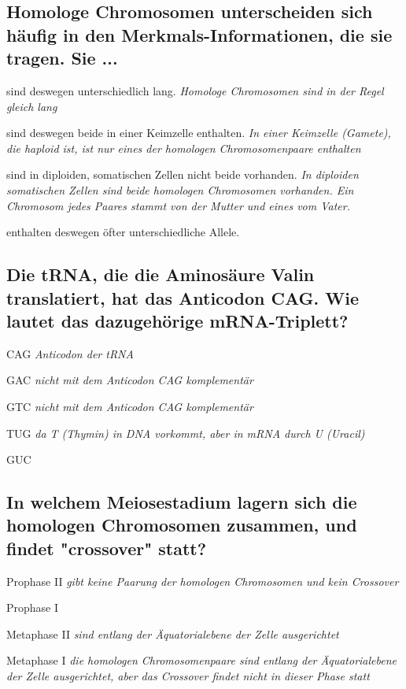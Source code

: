 \documentclass{article}
\newcommand{\cmark}{\ding{51}}%
\newcommand{\done}{\rlap{$\square$}{\raisebox{2pt}{\large\hspace{1pt}\cmark}}%
\hspace{-2.5pt}}
\begin{document}
\subsection*{Homologe Chromosomen unterscheiden sich häufig in den Merkmals-Informationen, die sie tragen. Sie ...}
\begin{todolist} %
\item sind deswegen unterschiedlich lang. \textit{\scriptsize Homologe Chromosomen sind in der Regel gleich lang}
\item sind deswegen beide in einer Keimzelle enthalten. \textit{\scriptsize In einer Keimzelle (Gamete), die haploid ist, ist nur eines der homologen Chromosomenpaare enthalten}
\item sind in diploiden, somatischen Zellen nicht beide vorhanden. \textit{\scriptsize In diploiden somatischen Zellen sind beide homologen Chromosomen vorhanden. Ein Chromosom jedes Paares stammt von der Mutter und eines vom Vater.}
\item [\done] enthalten deswegen öfter unterschiedliche Allele.
\end{todolist}%
\subsection*{Die tRNA, die die Aminosäure Valin translatiert, hat das Anticodon CAG.
Wie lautet das dazugehörige mRNA-Triplett?}
\begin{todolist}
\item CAG \textit{\scriptsize Anticodon der tRNA}
\item GAC \textit{\scriptsize nicht mit dem Anticodon CAG komplementär}
\item GTC \textit{\scriptsize nicht mit dem Anticodon CAG komplementär}
\item TUG \textit{\scriptsize da T (Thymin) in DNA vorkommt, aber in mRNA durch U (Uracil) }
\item [\done] GUC
\end{todolist}
\subsection*{In welchem Meiosestadium lagern sich die homologen Chromosomen zusammen, und findet "crossover" statt?}
\begin{todolist} %
\item Prophase II \textit{\scriptsize gibt keine Paarung der homologen Chromosomen und kein Crossover}
\item [\done] Prophase I
\item Metaphase II \textit{\scriptsize sind entlang der Äquatorialebene der Zelle ausgerichtet}
\item Metaphase I \textit{\scriptsize die homologen Chromosomenpaare sind entlang der Äquatorialebene der Zelle ausgerichtet, aber das Crossover findet nicht in dieser Phase statt}
\end{todolist}
\end{document}
